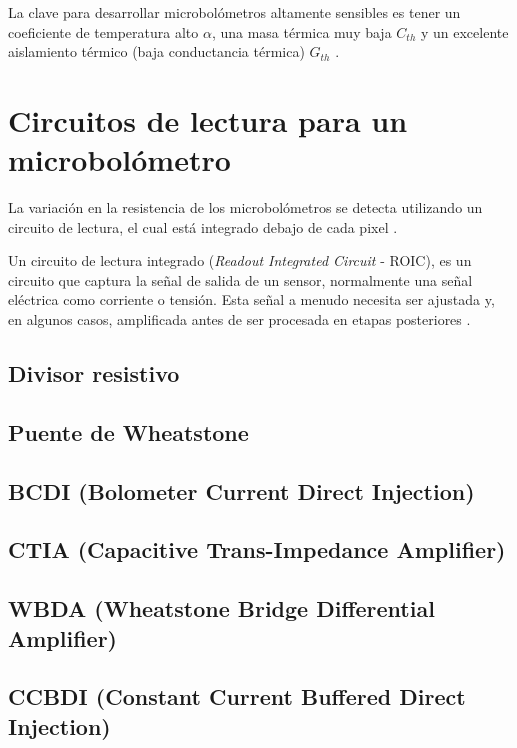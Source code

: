         
La clave para desarrollar microbolómetros altamente sensibles es tener un coeficiente de temperatura alto $\alpha$, una masa térmica muy baja $C_{th}$ y un excelente aislamiento térmico (baja conductancia térmica) $G_{th}$ \cite{Rogalski}.

\section{Circuitos de lectura para un microbolómetro}
La variación en la resistencia de los microbolómetros se detecta utilizando un circuito de lectura, el cual está integrado debajo de cada pixel \cite{Budzier}.


Un circuito de lectura integrado (\textit{Readout Integrated Circuit} - ROIC), es un circuito que captura la señal de salida de un sensor, normalmente una señal eléctrica como corriente o tensión. Esta señal a menudo necesita ser ajustada y, en algunos casos, amplificada antes de ser procesada en etapas posteriores \cite{BlancoMDA}.

\subsection{Divisor resistivo}
\subsection{Puente de Wheatstone}
\subsection{BCDI (Bolometer Current Direct Injection)}
\subsection{CTIA (Capacitive Trans-Impedance Amplifier)}
\subsection{WBDA (Wheatstone Bridge Differential Amplifier)}
\subsection{CCBDI (Constant Current Buffered Direct Injection)}